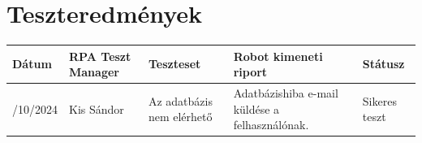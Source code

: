 \documentclass[
]{thesis-ekf}
\theoremstyle{definition}
\theoremstyle{remark}
\begin{document}
\section{Teszteredmények}\label{Teszteredmenyek}
\begin{table}[!ht]
	\centering
	\setlength{\extrarowheight}{3pt}
	
	\begin{tabularx}{\textwidth}{|>{\centering}X
			|>{\centering}X
			|>{\centering}X
			|>{\centering}X
			|>{\centering\arraybackslash}X
			|}
		\hline
		\rowcolor{gray!15}
		Dátum &
		RPA Teszt Manager &
		Teszteset&
		Robot kimeneti riport&
		Státusz
		\\
		\hline
		20/10/2024
		&Kis Sándor
		&Az adatbázis nem elérhető
		&Adatbázishiba e-mail küldése a felhasználónak.
		&Sikeres teszt
		\\
		\hline	
	\end{tabularx}
	
\end{table}
\end{document}
